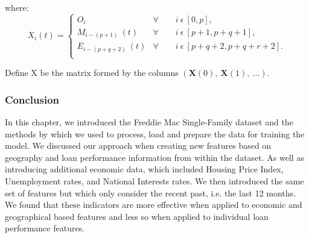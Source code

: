         \begin{adjustwidth}{2.5em}{0pt}
            where:
            \begin{equation}
                X _i (t) = 
                    \begin{cases}
                        O _i      & \forall \qquad  i\: \epsilon\: [0, p], \\
                        M _{i - (p + 1)}\: (t)  & \forall \qquad  i\: \epsilon\: [p + 1, p + q + 1], \\
                        E _{i - (p + q + 2)}\: (t)  & \forall \qquad  i\: \epsilon\: [p + q + 2, p + q + r + 2]. \\
                    \end{cases}
           \end{equation} 

           \vspace{20pt}

        \end{adjustwidth}
       
        \noindent Define X be the matrix formed by the columns $(\textbf{X} (0),\: \textbf{X} (1),\: ...)$.

            
        \vspace{20pt}



    \subsubsection{Conclusion}
        In this chapter, we introduced the Freddie Mac Single-Family dataset and the methods by which we used to process, load and prepare the data for training the model. We discussed our approach when creating new features based on geography and loan performance information from within the dataset. As well as introducing additional economic data, which included Housing Price Index, Unemployment rates, and National Interests rates. We then introduced the same set of features but which only consider the recent past, i.e. the last 12 months. We found that these indicators are more effective when applied to economic and geographical based features and less so when applied to individual loan performance features. 
        
        
        
        